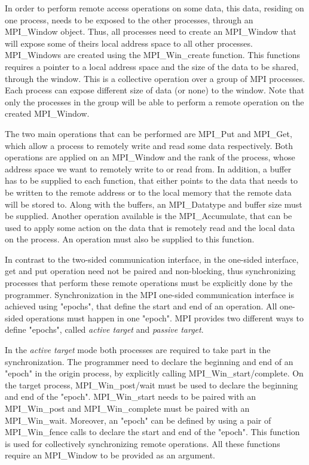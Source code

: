 In order to perform remote access operations on some data, this data, residing on one process, needs to be exposed to 
the other processes, through an MPI\_Window object.  Thus, all processes need to create an MPI\_Window that will expose
some of theirs local address space to all other processes.  MPI\_Windows are created using the MPI\_Win\_create function.
This functions requires a pointer to a local address space and the size of the data to be shared, through the window.
This is a collective operation over a group of MPI processes.  Each process can expose different size of data (or none)
to the window. Note that only the processes in the group will be able
to perform a remote operation on the created MPI\_Window.

The two main operations that can be performed are MPI\_Put and MPI\_Get, which allow a process to remotely write and
read some data respectively.  Both operations are applied on an MPI\_Window and the rank of the process, whose address
space  we want to remotely write to or read from.  In addition, a buffer has to be supplied to each function, that
either points to the data that needs to be written to the remote address or to the local memory that the remote data
will be stored to.  Along with the buffers, an MPI\_Datatype and buffer size must be supplied.  Another operation 
available is the MPI\_Accumulate, that can be used to apply some action on the data that is remotely read and the local
data on the process.  An operation must also be supplied to this function.    

In contrast to the two-sided communication interface, in the one-sided interface, get and put operation need not 
be paired and non-blocking, thus synchronizing processes that perform these remote operations must be explicitly
done by the programmer.  Synchronization in the MPI one-sided communication interface is achieved using "epochs",
that define the start and end of an operation.  All one-sided operations must happen in one "epoch".  MPI provides
two different ways to define "epochs", called \emph{active target} and \emph{passive target}.

In the \emph{active target} mode both processes are required to take part in the synchronization.  The programmer 
need to declare the beginning and end of an "epoch" in the origin process, by explicitly calling MPI\_Win\_start/complete.
On the target process, MPI\_Win\_post/wait must be used to declare the beginning and end of the "epoch".  MPI\_Win\_start needs
to be paired with an MPI\_Win\_post and MPI\_Win\_complete must be paired with an MPI\_Win\_wait.  Moreover, an "epoch" can be 
defined by using a pair of MPI\_Win\_fence calls to declare the start and end of the "epoch".  This function is used for 
collectively synchronizing remote operations.  All these functions require an MPI\_Window to be provided as an argument. 

